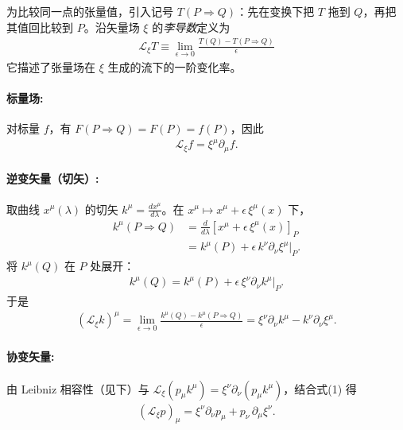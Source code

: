 为比较同一点的张量值，引入记号 $T(P\Rightarrow Q)$：先在变换下把 $T$ 拖到 $Q$，再把其值回比较到 $P$。沿矢量场 $\xi$ 的\emph{李导数}定义为
\begin{align}
\mathcal{L}_\xi T \equiv \lim_{\epsilon\to 0}\frac{T(Q)-T(P\Rightarrow Q)}{\epsilon} \nonumber
\end{align}
它描述了张量场在 $\xi$ 生成的流下的一阶变化率。

\paragraph{标量场:}
对标量 $f$，有 $F(P\Rightarrow Q)=F(P)=f(P)$，因此
\begin{align}
\mathcal{L}_\xi f=\xi^\mu\partial_\mu f . \nonumber
\end{align}

\paragraph{逆变矢量（切矢）:}
取曲线 $x^\mu(\lambda)$ 的切矢 $k^\mu=\frac{dx^\mu}{d\lambda}$。在
$x^\mu\mapsto x^\mu+\epsilon\,\xi^\mu(x)$ 下，
\begin{align}
k^\mu(P\Rightarrow Q)
&=\frac{d}{d\lambda}\!\left[x^\mu+\epsilon\,\xi^\mu(x)\right]_{P} \nonumber\\
&= k^\mu(P)+\epsilon\,k^\nu\partial_\nu\xi^\mu\big|_{P}. \nonumber
\end{align}
将 $k^\mu(Q)$ 在 $P$ 处展开：
\begin{align}
k^\mu(Q)=k^\mu(P)+\epsilon\,\xi^\nu\partial_\nu k^\mu\big|_{P}. \nonumber
\end{align}
于是
\begin{align}
(\mathcal{L}_\xi k)^\mu
=\lim_{\epsilon\to 0}\frac{k^\mu(Q)-k^\mu(P\Rightarrow Q)}{\epsilon}
=\xi^\nu\partial_\nu k^\mu-k^\nu\partial_\nu\xi^\mu .
\tag{1}
\end{align}

\paragraph{协变矢量:}由 Leibniz 相容性（见下）与
$\mathcal{L}_\xi(p_\mu k^\mu)=\xi^\nu\partial_\nu(p_\mu k^\mu)$，结合式(1) 得
\begin{align}
(\mathcal{L}_\xi p)_\mu=\xi^\nu\partial_\nu p_\mu+p_\nu\,\partial_\mu\xi^\nu .
\tag{2}
\end{align}

